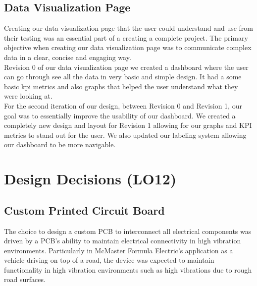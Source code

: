 \documentclass[12pt,titlepage]{article}
\begin{document}
\subsection{Data Visualization Page}

Creating our data visualization page that the user could understand and use from their testing was an essential part of a creating a complete project. The primary objective when creating our data visualization page was to communicate complex data in a clear, concise and engaging way. \\

Revision 0 of our data visualization page we created a dashboard where the user can go through see all the data in very basic and simple design. It had a some basic kpi metrics and also graphs that helped the user understand what they were looking at.\\

For the second iteration of our design, between Revision 0 and Revision 1, our goal was to essentially improve the usability of our dashboard. We created a completely new design and layout for Revision 1 allowing for our graphs and KPI metrics to stand out for the user. We also updated our labeling system allowing our dashboard to be more navigable.\\

\section{Design Decisions (LO12)}


\subsection{Custom Printed Circuit Board}
The choice to design a custom PCB to interconnect all electrical components was driven by a PCB's ability to maintain  electrical connectivity in high vibration environments. Particularly in McMaster Formula Electric's application as a vehicle driving on top of a road, the device was expected to maintain functionality in high vibration environments such as high vibrations due to rough road surfaces. \\
\end{document}

